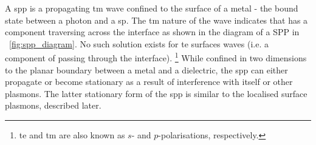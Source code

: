 \documentclass{article}
\begin{document}
A \gls{spp} is a propagating \gls{tm} wave confined to the surface of a metal - the bound state between a photon and a \gls{sp}.
The \gls{tm} nature of the wave indicates that  has a component traversing across the interface as shown in the diagram of a SPP in \figurename~\ref{fig:spp_diagram}. No such solution exists for \gls{te} surfaces waves (i.e. a component of  passing through the interface).%
\footnote{\gls{te} and \gls{tm} are also known as $s$- and $p$-polarisations, respectively.}
While confined in two dimensions to the planar boundary between a metal and a dielectric, the \gls{spp} can either propagate or become stationary as a result of interference {\color{red}with itself or other plasmons}. The latter stationary form of the \gls{spp} is similar to the localised surface plasmons, described later.
\end{document}
